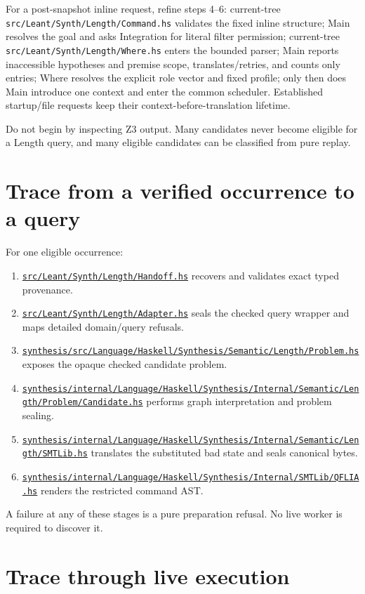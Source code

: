 \documentclass[10pt,letterpaper,oneside]{report}
\newcommand{\code}[1]{\texttt{\detokenize{#1}}}
\newcommand{\filepath}[1]{\nolinkurl{#1}}
\def\LeantCommit{494259dbd85ae2e6749246b08377f44b2f9936ac}
\def\DjexPinnedCommit{7d65eba6f753727ae7b3d734fb4a7e00f1f44aa7}
\def\LeantBase{https://github.com/VladimirReshetnikov/Leant/blob/\LeantCommit/}
\def\DjexBase{https://github.com/VladimirReshetnikov/Djex/blob/\DjexPinnedCommit/}
\newcommand{\lpath}[1]{\href{\LeantBase#1}{\nolinkurl{#1}}}
\newcommand{\dpath}[1]{\href{\DjexBase#1}{\nolinkurl{#1}}}
\begin{document}
For a post-snapshot inline request, refine steps 4--6: current-tree
\filepath{src/Leant/Synth/Length/Command.hs} validates the fixed inline
structure; Main resolves the goal and asks Integration for literal filter
permission; current-tree \filepath{src/Leant/Synth/Length/Where.hs} enters the
bounded parser; Main reports inaccessible hypotheses and premise scope,
translates/retries, and counts only \code{SlotArrow} entries; Where resolves
the explicit role vector and fixed profile; only then does Main introduce one
context and enter the common scheduler. Established startup/file requests keep
their context-before-translation lifetime.

Do not begin by inspecting Z3 output. Many candidates never become eligible for a Length query, and many eligible candidates can be classified from pure replay.

\section{Trace from a verified occurrence to a query}

For one eligible occurrence:

\begin{enumerate}
\item \lpath{src/Leant/Synth/Length/Handoff.hs} recovers and validates exact typed provenance.
\item \lpath{src/Leant/Synth/Length/Adapter.hs} seals the checked query wrapper and maps detailed domain/query refusals.
\item \dpath{synthesis/src/Language/Haskell/Synthesis/Semantic/Length/Problem.hs} exposes the opaque checked candidate problem.
\item \dpath{synthesis/internal/Language/Haskell/Synthesis/Internal/Semantic/Length/Problem/Candidate.hs} performs graph interpretation and problem sealing.
\item \dpath{synthesis/internal/Language/Haskell/Synthesis/Internal/Semantic/Length/SMTLib.hs} translates the substituted bad state and seals canonical bytes.
\item \dpath{synthesis/internal/Language/Haskell/Synthesis/Internal/SMTLib/QFLIA.hs} renders the restricted command AST.
\end{enumerate}

A failure at any of these stages is a pure preparation refusal. No live worker is required to discover it.

\section{Trace through live execution}
\end{document}
